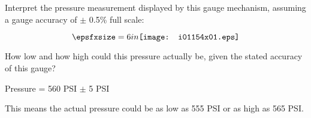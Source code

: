 

Interpret the pressure measurement displayed by this gauge mechanism, assuming a gauge accuracy of $\pm$ 0.5\% full scale:

$$\epsfxsize=6in \texttt{[image: i01154x01.eps]}$$

How low and how high could this pressure actually be, given the stated accuracy of this gauge?







Pressure = 560 PSI $\pm$ 5 PSI
 
\vskip 10pt

This means the actual pressure could be as low as 555 PSI or as high as 565 PSI.











